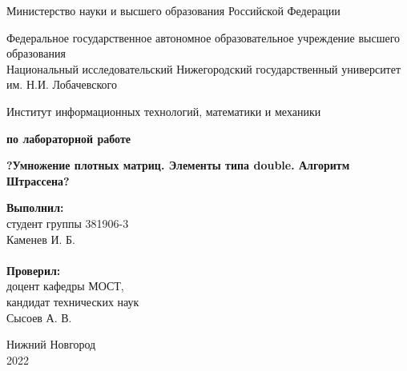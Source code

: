 \documentclass{report}
\begin{document}
\begin{titlepage}

\begin{center}
Министерство науки и высшего образования Российской Федерации
\end{center}

\begin{center}
Федеральное государственное автономное образовательное учреждение высшего образования \\
Национальный исследовательский Нижегородский государственный университет им. Н.И. Лобачевского
\end{center}

\begin{center}
Институт информационных технологий, математики и механики
\end{center}

\vspace{4em}

\begin{center}
\textbf{ по лабораторной работе} \\
\end{center}
\begin{center}
\textbf{\Large?Умножение плотных матриц. Элементы типа double. Алгоритм Штрассена?} \\
\end{center}

\vspace{4em}

\newbox{\lbox}
\newlength{\maxl}
\setlength{\maxl}{\wd\lbox}
\hfill\parbox{7cm}{
\hspace*{5cm}\hspace*{-5cm}\textbf{Выполнил:} \\ студент группы 381906-3 \\ Каменев И. Б.\\
\\
\hspace*{5cm}\hspace*{-5cm}\textbf{Проверил:}\\ доцент кафедры МОСТ, \\ кандидат технических наук \\ Сысоев А. В.\\
}
\vspace{\fill}

\begin{center} Нижний Новгород \\ 2022 \end{center}

\end{titlepage}
\end{document}
